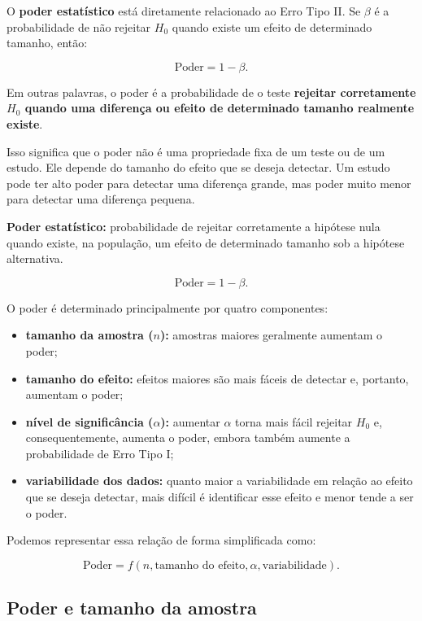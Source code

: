 O \textbf{poder estatístico} está diretamente relacionado ao Erro Tipo II. Se
$\beta$ é a probabilidade de não rejeitar $H_0$ quando existe um efeito de
determinado tamanho, então:

\[
\text{Poder}=1-\beta.
\]

Em outras palavras, o poder é a probabilidade de o teste \textbf{rejeitar
corretamente $H_0$ quando uma diferença ou efeito de determinado tamanho
realmente existe}.

Isso significa que o poder não é uma propriedade fixa de um teste ou de um
estudo. Ele depende do tamanho do efeito que se deseja detectar. Um estudo
pode ter alto poder para detectar uma diferença grande, mas poder muito menor
para detectar uma diferença pequena.

\begin{definition}
\textbf{Poder estatístico:} probabilidade de rejeitar corretamente a hipótese
nula quando existe, na população, um efeito de determinado tamanho sob a
hipótese alternativa.

\[
\text{Poder}=1-\beta.
\]
\end{definition}

O poder é determinado principalmente por quatro componentes:

\begin{itemize}
    \item \textbf{tamanho da amostra ($n$):} amostras maiores geralmente
    aumentam o poder;

    \item \textbf{tamanho do efeito:} efeitos maiores são mais fáceis de
    detectar e, portanto, aumentam o poder;

    \item \textbf{nível de significância ($\alpha$):} aumentar $\alpha$
    torna mais fácil rejeitar $H_0$ e, consequentemente, aumenta o poder,
    embora também aumente a probabilidade de Erro Tipo I;

    \item \textbf{variabilidade dos dados:} quanto maior a variabilidade
    em relação ao efeito que se deseja detectar, mais difícil é identificar
    esse efeito e menor tende a ser o poder.
\end{itemize}

Podemos representar essa relação de forma simplificada como:

\[
\text{Poder}
=
f(n,\text{tamanho do efeito},\alpha,\text{variabilidade}).
\]

\subsection{Poder e tamanho da amostra}

